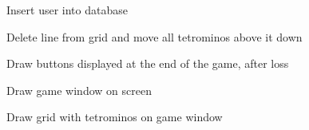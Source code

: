 \documentclass[letterpaper,10pt,english]{sphinxmanual}
\begin{document}
\begin{fulllineitems}
\begin{fulllineitems}
\label{\detokenize{game:game.Game.db_insert_user}}
\pysigstartsignatures
{}
\pysigstopsignatures
\sphinxAtStartPar
Insert user into database

\end{fulllineitems}


\begin{fulllineitems}
\label{\detokenize{game:game.Game.delete_line}}
\pysigstartsignatures
{}
\pysigstopsignatures
\sphinxAtStartPar
Delete line from grid and move all tetrominos above it down

\end{fulllineitems}


\begin{fulllineitems}
\label{\detokenize{game:game.Game.draw_end_of_game_btns}}
\pysigstartsignatures
{}
\pysigstopsignatures
\sphinxAtStartPar
Draw buttons displayed at the end of the game, after loss

\end{fulllineitems}


\begin{fulllineitems}
\label{\detokenize{game:game.Game.draw_game_window}}
\pysigstartsignatures
{}
\pysigstopsignatures
\sphinxAtStartPar
Draw game window on screen

\end{fulllineitems}


\begin{fulllineitems}
\label{\detokenize{game:game.Game.draw_grid}}
\pysigstartsignatures
{}
\pysigstopsignatures
\sphinxAtStartPar
Draw grid with tetrominos on game window


\end{fulllineitems}
\end{fulllineitems}
\end{document}
